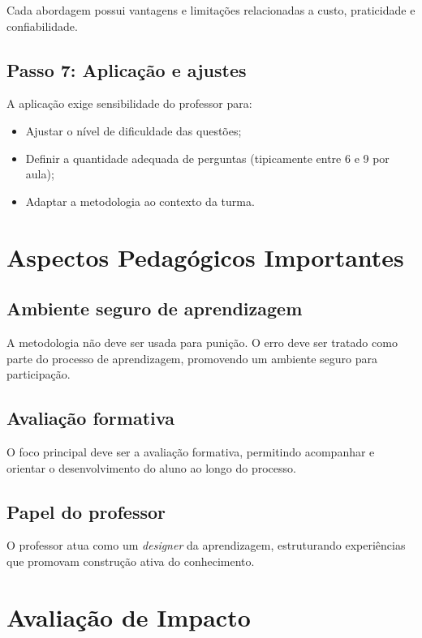 Cada abordagem possui vantagens e limitações relacionadas a custo, praticidade e confiabilidade.

\subsection{Passo 7: Aplicação e ajustes}

A aplicação exige sensibilidade do professor para:

\begin{itemize}
    \item Ajustar o nível de dificuldade das questões;
    \item Definir a quantidade adequada de perguntas (tipicamente entre 6 e 9 por aula);
    \item Adaptar a metodologia ao contexto da turma.
\end{itemize}

\section{Aspectos Pedagógicos Importantes}

\subsection{Ambiente seguro de aprendizagem}

A metodologia não deve ser usada para punição. O erro deve ser tratado como parte do processo de aprendizagem, promovendo um ambiente seguro para participação.

\subsection{Avaliação formativa}

O foco principal deve ser a avaliação formativa, permitindo acompanhar e orientar o desenvolvimento do aluno ao longo do processo.

\subsection{Papel do professor}

O professor atua como um \textit{designer} da aprendizagem, estruturando experiências que promovam construção ativa do conhecimento.

\section{Avaliação de Impacto}

